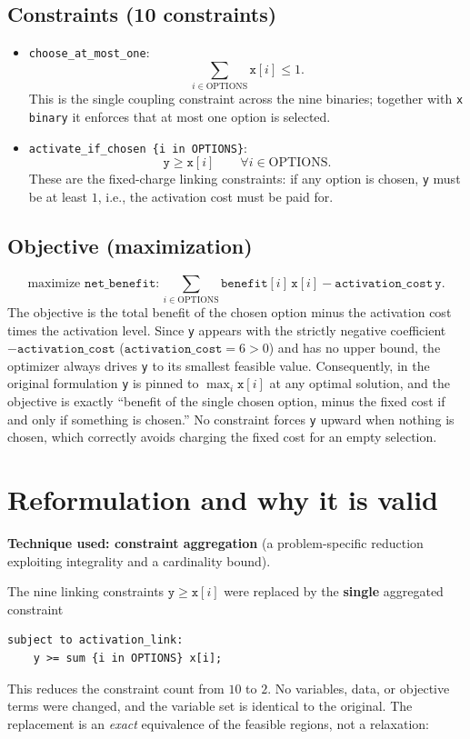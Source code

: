 \documentclass{article}
\begin{document}
\subsection*{Constraints (10 constraints)}
\begin{itemize}
  \item \texttt{choose\_at\_most\_one}:
  \[
    \sum_{i\in\mathrm{OPTIONS}} \mathtt{x}[i] \le 1.
  \]
  This is the single coupling constraint across the nine binaries; together with \texttt{x binary} it enforces that at most one option is selected.

  \item \texttt{activate\_if\_chosen \{i in OPTIONS\}}:
  \[
    \mathtt{y} \ge \mathtt{x}[i] \qquad \forall i\in\mathrm{OPTIONS}.
  \]
  These are the fixed-charge linking constraints: if any option is chosen, \texttt{y} must be at least \(1\), i.e., the activation cost must be paid for.
\end{itemize}

\subsection*{Objective (maximization)}
\[
  \text{maximize } \mathtt{net\_benefit}:
  \sum_{i\in\mathrm{OPTIONS}} \mathtt{benefit}[i]\,\mathtt{x}[i]
  - \mathtt{activation\_cost}\,\mathtt{y}.
\]
The objective is the total benefit of the chosen option minus the activation cost times the activation level. Since \texttt{y} appears with the strictly negative coefficient \(-\mathtt{activation\_cost}\) (\(\mathtt{activation\_cost}=6>0\)) and has no upper bound, the optimizer always drives \texttt{y} to its smallest feasible value. Consequently, in the original formulation \texttt{y} is pinned to \(\max_i \mathtt{x}[i]\) at any optimal solution, and the objective is exactly ``benefit of the single chosen option, minus the fixed cost if and only if something is chosen.'' No constraint forces \texttt{y} upward when nothing is chosen, which correctly avoids charging the fixed cost for an empty selection.

\section{Reformulation and why it is valid}

\textbf{Technique used: constraint aggregation} (a problem-specific reduction exploiting integrality and a cardinality bound).

The nine linking constraints \(\mathtt{y} \ge \mathtt{x}[i]\) were replaced by the \textbf{single} aggregated constraint
\begin{verbatim}
subject to activation_link:
    y >= sum {i in OPTIONS} x[i];
\end{verbatim}
This reduces the constraint count from \(10\) to \(2\). No variables, data, or objective terms were changed, and the variable set is identical to the original. The replacement is an \emph{exact} equivalence of the feasible regions, not a relaxation:
\end{document}
